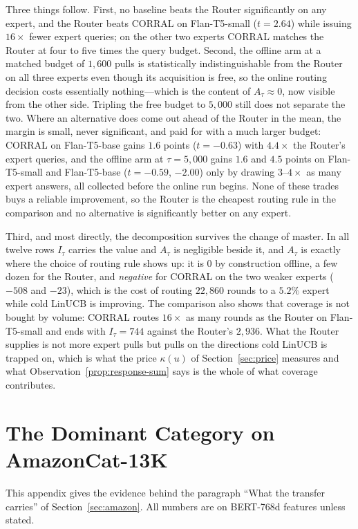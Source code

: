 \documentclass[anon]{alt2027} %
\begin{document}
Three things follow. First, no baseline beats the Router significantly on any
expert, and the Router beats CORRAL on Flan-T5-small ($t=2.64$) while issuing
$16\times$ fewer expert queries; on the other two experts CORRAL matches the
Router at four to five times the query budget. Second, the offline arm at a
matched budget of $1{,}600$ pulls is statistically indistinguishable from the
Router on all three experts even though its acquisition is free, so the online
routing decision costs essentially nothing---which is the content of
$A_\tau\approx0$, now visible from the other side. Tripling the free budget to
$5{,}000$ still does not separate the two. Where an alternative does come out
ahead of the Router in the mean, the margin is small, never significant, and
paid for with a much larger budget: CORRAL on Flan-T5-base gains $1.6$
points ($t=-0.63$) with $4.4\times$ the Router's expert queries, and the
offline arm at $\tau=5{,}000$ gains $1.6$ and $4.5$ points on Flan-T5-small
and Flan-T5-base ($t=-0.59$, $-2.00$) only by drawing $3$--$4\times$ as many
expert answers, all collected before the online run begins. None of these
trades buys a reliable improvement, so the Router is the cheapest routing rule in
the comparison and no alternative is significantly better on any expert.

Third, and most directly, the decomposition survives the change of master. In
all twelve rows $I_\tau$ carries the value and $A_\tau$ is negligible beside
it, and $A_\tau$ is exactly where the choice of routing rule shows up: it is $0$ by
construction offline, a few dozen for the Router, and \emph{negative} for CORRAL
on the two weaker experts ($-508$ and $-23$), which is the cost of routing
$22{,}860$ rounds to a $5.2\%$ expert while cold LinUCB is improving. The
comparison also shows that coverage is not bought by volume: CORRAL routes
$16\times$ as many rounds as the Router on Flan-T5-small and ends with
$I_\tau=744$ against the Router's $2{,}936$. What the Router supplies is not more
expert pulls but pulls on the directions cold LinUCB is trapped on, which is
what the price $\kappa(u)$ of Section~\ref{sec:price} measures and what
Observation~\ref{prop:response-sum} says is the whole of what coverage contributes.

\section{The Dominant Category on AmazonCat-13K}
\label{app:dominant}

This appendix gives the evidence behind the paragraph ``What the transfer
carries'' of Section~\ref{sec:amazon}. All numbers are on BERT-768d features
unless stated.
\end{document}
